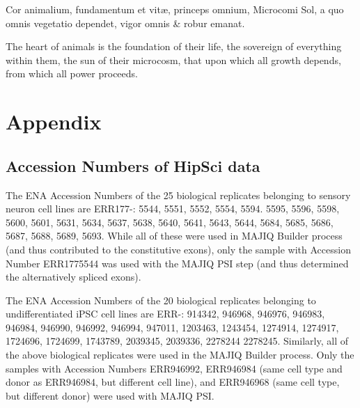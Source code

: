 \begin{savequote}[8cm]
\textlatin{Cor animalium, fundamentum e\longs t vitæ, princeps omnium, Microco\longs mi Sol, a quo omnis vegetatio dependet, vigor omnis \& robur emanat.}

The heart of animals is the foundation of their life, the sovereign of everything within them, the sun of their microcosm, that upon which all growth depends, from which all power proceeds.
\end{savequote}

\chapter{\label{app:appendix}Appendix}

\minitoc


\section{Accession Numbers of HipSci data} \label{app:hipsci_celllines}
The ENA Accession Numbers of the 25 biological replicates belonging to sensory neuron cell lines \cite{ipscneurons} are ERR177-: 
5544, 5551, 5552, 5554, 5594. 5595, 5596, 5598, 5600, 5601, 5631, 5634, 5637, 5638, 5640, 5641, 5643, 5644, 5684, 5685, 5686, 5687, 5688, 5689, 5693.
While all of these were used in MAJIQ Builder process (and thus contributed to the constitutive exons), only the sample with Accession Number ERR1775544 was used with the MAJIQ PSI step (and thus determined the alternatively spliced exons). 

The ENA Accession Numbers of the 20 biological replicates belonging to undifferentiated iPSC cell lines \cite{hipsci} are ERR-: 
914342, 946968, 946976, 946983, 946984, 946990, 946992, 946994, 947011, 1203463, 1243454, 1274914, 1274917, 1724696, 1724699, 1743789, 2039345, 2039336, 2278244 2278245.
Similarly, all of the above biological replicates were used in the MAJIQ Builder process. Only the samples with Accession Numbers ERR946992, ERR946984 (same cell type and donor as ERR946984, but different cell line), and ERR946968 (same cell type, but different donor) were used with MAJIQ PSI. 
%
%
%
%
%
%
%
%

